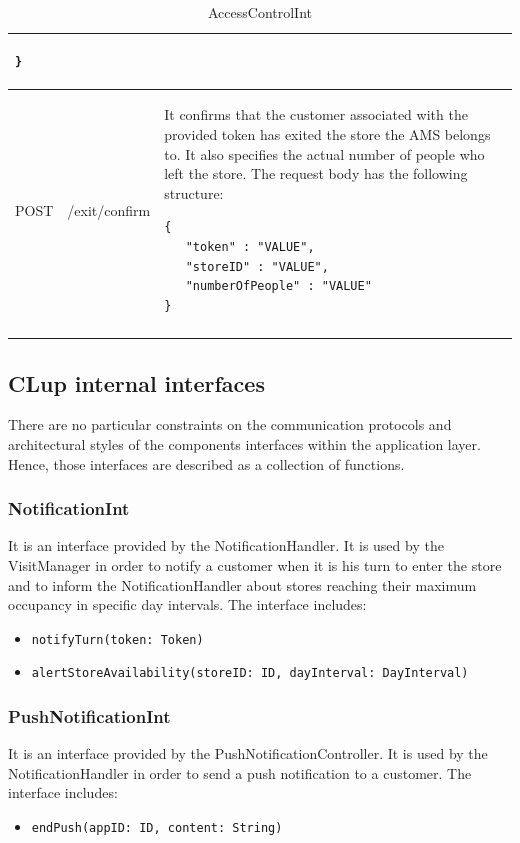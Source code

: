 \documentclass[a4paper,oneside,11pt]{book}
\newcommand{\red}[1]{\begingroup\color{punct}#1\endgroup}
\begin{document}
\begin{longtable}[c] { |>{\centering\arraybackslash}H{0.11\textwidth}|>{\centering\arraybackslash\ttfamily}P{0.23\textwidth}|H{0.50\textwidth}| }
\begin{lstlisting}[language=jsonDD]
}
        \end{lstlisting}
        \\ \hline POST & /exit/confirm & It confirms that the customer associated with the provided token has exited the store the AMS belongs to. It also specifies the actual number of people who left the store. The request body has the following structure:
        \begin{lstlisting}[language=jsonDD]
{
   "token" : "VALUE",
   "storeID" : "VALUE",
   "numberOfPeople" : "VALUE"
}
        \end{lstlisting} \\ \hline
        \caption{AccessControlInt}
        \label{table:accesscontrol_int}
    \end{longtable}
    
    \subsection{CLup internal interfaces}
    There are no particular constraints on the communication protocols and architectural styles of the components interfaces within the application layer. Hence, those interfaces are described as a collection of functions.
    \subsubsection{NotificationInt}
   It is an interface provided by the NotificationHandler. It is used by the VisitManager in order to notify a customer when it is his turn to enter the store and to inform the NotificationHandler about stores reaching their maximum occupancy in specific day intervals. The interface includes:
   \begin{itemize}
       \item \texttt{notifyTurn(token: \red{Token})}
       \item \texttt{alertStoreAvailability(storeID: \red{ID}, dayInterval: \red{DayInterval})}
   \end{itemize}
    \subsubsection{PushNotificationInt}
    It is an interface provided by the PushNotificationController. It is used by the NotificationHandler in order to send a push notification to a customer. The interface includes:
    \begin{itemize}
       \item \texttt{endPush(appID: \red{ID}, content: \red{String})}
   \end{itemize}
   
\end{document}
